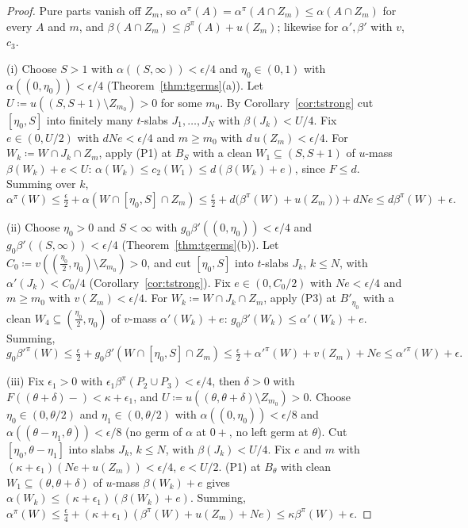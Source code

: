 \documentclass[11pt]{article}
\theoremstyle{definition}\newtheorem{definition}[theorem]{Definition}
\theoremstyle{remark}\newtheorem{remark}[theorem]{Remark}
\begin{document}
\begin{proof}
Pure parts vanish off $Z_m$, so $\alpha^\pi(A)=\alpha^\pi(A\cap Z_m)\le
\alpha(A\cap Z_m)$ for every $A$ and $m$, and $\beta(A\cap Z_m)\le\beta^\pi(A)+
u(Z_m)$; likewise for $\alpha',\beta'$ with $v$, $c_3$.

(i) Choose $S>1$ with $\alpha((S,\infty))<\epsilon/4$ and $\eta_0\in(0,1)$
with $\alpha((0,\eta_0))<\epsilon/4$ (Theorem~\ref{thm:tgerms}(a)). Let
$U\coloneqq u((S,S+1)\setminus Z_{m_0})>0$ for some $m_0$. By
Corollary~\ref{cor:tstrong} cut $[\eta_0,S]$ into finitely many $t$-slabs
$J_1,\dots,J_N$ with $\beta(J_k)<U/4$. Fix $e\in(0,U/2)$ with $dNe<\epsilon/4$
and $m\ge m_0$ with $d\,u(Z_m)<\epsilon/4$. For $W_k\coloneqq W\cap J_k\cap
Z_m$, apply (P1) at $B_S$ with a clean $W_1\subseteq(S,S+1)$ of $u$-mass
$\beta(W_k)+e<U$: $\alpha(W_k)\le c_2(W_1)\le d(\beta(W_k)+e)$, since $F\le d$.
Summing over $k$,
\[
 \alpha^\pi(W)\le\tfrac\epsilon2+\alpha(W\cap[\eta_0,S]\cap Z_m)\le
 \tfrac\epsilon2+d\bigl(\beta^\pi(W)+u(Z_m)\bigr)+dNe\le d\beta^\pi(W)+\epsilon.
\]

(ii) Choose $\eta_0>0$ and $S<\infty$ with $g_0\beta'((0,\eta_0))<
\epsilon/4$ and $g_0\beta'((S,\infty))<\epsilon/4$
(Theorem~\ref{thm:tgerms}(b)). Let $C_0\coloneqq v((\frac{\eta_0}2,\eta_0)
\setminus Z_{m_0})>0$, and cut $[\eta_0,S]$ into $t$-slabs $J_k$, $k\le N$,
with $\alpha'(J_k)<C_0/4$ (Corollary~\ref{cor:tstrong}). Fix $e\in(0,C_0/2)$
with $Ne<\epsilon/4$ and $m\ge m_0$ with $v(Z_m)<\epsilon/4$. For
$W_k\coloneqq W\cap J_k\cap Z_m$, apply (P3) at $B'_{\eta_0}$ with a clean
$W_4\subseteq(\frac{\eta_0}2,\eta_0)$ of $v$-mass $\alpha'(W_k)+e$:
$g_0\beta'(W_k)\le\alpha'(W_k)+e$. Summing,
\[
 g_0\beta'^\pi(W)\le\tfrac\epsilon2+g_0\beta'(W\cap[\eta_0,S]\cap Z_m)\le
 \tfrac\epsilon2+\alpha'^\pi(W)+v(Z_m)+Ne\le\alpha'^\pi(W)+\epsilon.
\]

(iii) Fix $\epsilon_1>0$ with $\epsilon_1\beta^\pi(P_2\cup P_3)<\epsilon/4$,
then $\delta>0$ with $F((\theta+\delta)-)<\kappa+\epsilon_1$, and
$U\coloneqq u((\theta,\theta+\delta)\setminus Z_{m_0})>0$. Choose
$\eta_0\in(0,\theta/2)$ and $\eta_1\in(0,\theta/2)$ with
$\alpha((0,\eta_0))<\epsilon/8$ and $\alpha((\theta-\eta_1,\theta))<
\epsilon/8$ (no germ of $\alpha$ at $0+$, no left germ at $\theta$). Cut
$[\eta_0,\theta-\eta_1]$ into slabs $J_k$, $k\le N$, with $\beta(J_k)<U/4$.
Fix $e$ and $m$ with $(\kappa+\epsilon_1)(Ne+u(Z_m))<\epsilon/4$, $e<U/2$.
(P1) at $B_\theta$ with clean $W_1\subseteq(\theta,\theta+\delta)$ of $u$-mass
$\beta(W_k)+e$ gives $\alpha(W_k)\le(\kappa+\epsilon_1)(\beta(W_k)+e)$.
Summing, $\alpha^\pi(W)\le\frac\epsilon4+(\kappa+\epsilon_1)(\beta^\pi(W)+
u(Z_m)+Ne)\le\kappa\beta^\pi(W)+\epsilon$.


\end{proof}
\end{document}
